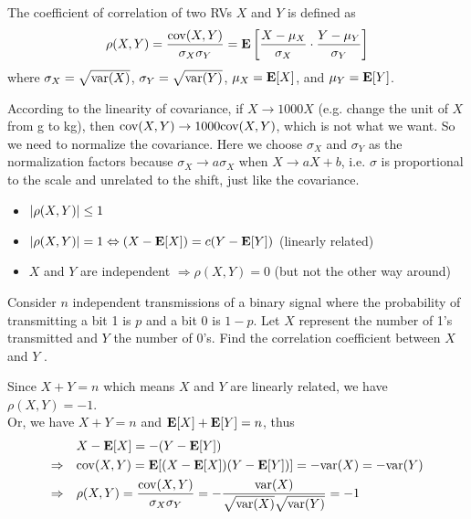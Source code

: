 \begin{definition}
    The coefficient of correlation of two RVs $X$ and $Y$ is defined as
    \begin{equation}
        \rho(X, Y) = \frac{\mathrm{cov}(X, Y)}{\sigma_X\sigma_Y} = \mathbf{E}\left[\frac{X - \mu_X}{\sigma_X} \cdot \frac{Y - \mu_Y}{\sigma_Y}\right]
    \end{equation}
    where $\sigma_X = \sqrt{\mathrm{var}(X)}$, $\sigma_Y = \sqrt{\mathrm{var}(Y)}$, $\mu_X = \mathbf{E}[X]$, and $\mu_Y = \mathbf{E}[Y]$. 
\end{definition}
According to the linearity of covariance, if $X \to 1000X$ (e.g. change the unit of $X$ from g to kg), then $\mathrm{cov}(X, Y) \to 1000 \mathrm{cov}(X, Y)$, which is not what we want. So we need to normalize the covariance. Here we choose $\sigma_X$ and $\sigma_Y$ as the normalization factors because $\sigma_X \to a\sigma_X$ when $X \to aX + b$, i.e. $\sigma$ is proportional to the scale and unrelated to the shift, just like the covariance.
\begin{property}
    \begin{itemize}
        \item $\abs{\rho(X, Y)} \leq 1$
        \item $\abs{\rho(X, Y)} = 1 \Leftrightarrow (X - \mathbf{E}[X]) = c(Y - \mathbf{E}[Y])$ (linearly related)
        \item $X$ and $Y$ are independent $\Rightarrow \rho(X, Y) = 0$ (but not the other way around)
    \end{itemize}
\end{property}

\begin{example}
    Consider $n$ independent transmissions of a binary signal where the probability of transmitting a bit 1 is $p$ and a bit 0 is $1 - p$. Let $X$ represent the number of 1's transmitted and $Y$ the number of 0's. Find the correlation coefficient between $X$ and $Y$ .
\end{example}
\begin{solution}
    Since $X + Y = n$ which means $X$ and $Y$ are linearly related, we have $\rho(X, Y) = -1$. \\ 
    Or, we have $X + Y = n$ and $\mathbf{E}[X] + \mathbf{E}[Y] = n$, thus
    \begin{equation}
    \begin{aligned}
        &X - \mathbf{E}[X] = -(Y - \mathbf{E}[Y]) \\ 
        \Rightarrow \quad &\mathrm{cov}(X, Y) = \mathbf{E}[(X - \mathbf{E}[X])(Y - \mathbf{E}[Y])] = -\mathrm{var}(X) = -\mathrm{var}(Y) \\ 
        \Rightarrow \quad &\rho(X, Y) = \frac{\mathrm{cov}(X, Y)}{\sigma_X \sigma_Y} = -\frac{\mathrm{var}(X)}{\sqrt{\mathrm{var}(X)}\sqrt{\mathrm{var}(Y)}} = -1
    \end{aligned}
    \end{equation}
\end{solution}


